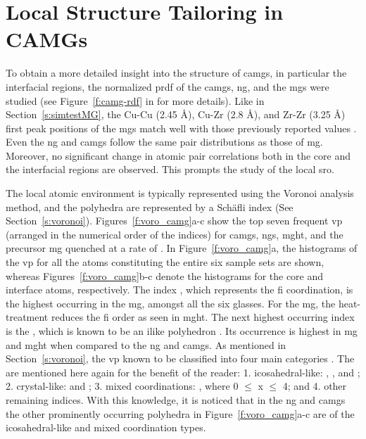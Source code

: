 \section{Local Structure Tailoring in CAMGs} \label{s:vorocamg}
\begin{changebar}
To obtain a more detailed insight into the structure of \gls{camg}s, in particular the interfacial regions, the normalized \gls{prdf} of the \gls{camg}s, \gls{ng}, and the \gls{mg}s were studied (see Figure~\ref{f:camg-rdf} in  for more details). Like in Section~\ref{s:simtestMG}, the Cu-Cu (2.45 \r{A}), Cu-Zr (2.8 \r{A}), and Zr-Zr (3.25 \r{A}) first peak positions of the \gls{mg}s match well with those previously reported values \cite{Nasu2007,Duan2005}. Even the \gls{ng} and \gls{camg}s follow the same pair distributions as those of \gls{mg}. Moreover, no significant change in atomic pair correlations both in the core and the interfacial regions are observed. This prompts the study of the local \gls{sro}. \par

The local atomic environment is typically represented using the Voronoi analysis method, and the polyhedra are represented by a   Sch\"afli index (See Section~\ref{s:voronoi}). Figures~\ref{f:voro_camg}a-c show the top seven frequent \gls{vp} (arranged in the numerical order of the indices) for \gls{camg}s, \gls{ng}s, \gls{mght}, and the precursor \gls{mg} quenched at a rate of . In Figure~\ref{f:voro_camg}a, the histograms of the \gls{vp} for all the atoms constituting the entire six sample sets are shown, whereas Figures~\ref{f:voro_camg}b-c denote the histograms for the core and interface atoms, respectively. The index , which represents the \gls{fi} coordination, is the highest occurring in the \gls{mg}, amongst all the six glasses. For the  \gls{mg}, the heat-treatment reduces the \gls{fi} order as seen in \gls{mght}. The next highest occurring index is the , which is known to be an \gls{ilike} polyhedron \cite{Yue2018,Borodin1999}. Its occurrence is highest in \gls{mg} and \gls{mght} when compared to the \gls{ng} and \gls{camg}s. As mentioned in Section~\ref{s:voronoi}, the \gls{vp} known to be classified into four main categories \cite{Yue2018}. The are mentioned here again for the benefit of the reader: 1. icosahedral-like: , , and ; 2. crystal-like:  and ; 3. mixed coordinations: , where 0 $\leq$ x $\leq$ 4; and 4. other remaining indices. With this knowledge, it is noticed that in the \gls{ng} and \gls{camg}s the other prominently occurring polyhedra in Figure~\ref{f:voro_camg}a-c are of the icosahedral-like and mixed coordination types. \par


\end{changebar}
